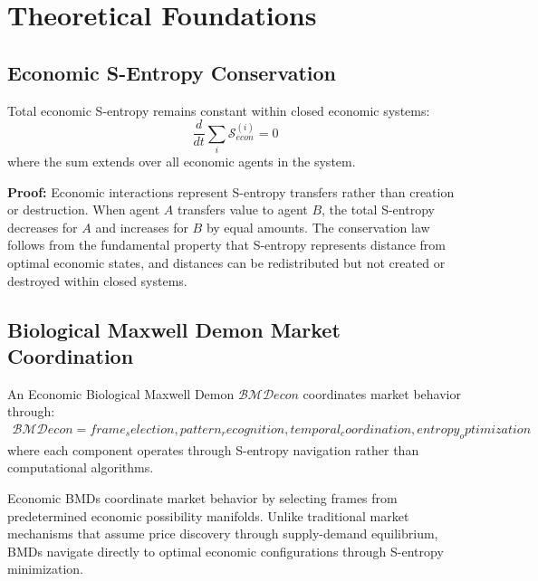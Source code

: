 \section{Theoretical Foundations}

\subsection{Economic S-Entropy Conservation}

\begin{theorem}
Total economic S-entropy remains constant within closed economic systems:
\begin{equation}
\frac{d}{dt}\sum_{i} \mathcal{S}_{econ}^{(i)} = 0
\end{equation}
where the sum extends over all economic agents in the system.

\textbf{Proof:}
Economic interactions represent S-entropy transfers rather than creation or destruction. When agent $A$ transfers value to agent $B$, the total S-entropy decreases for $A$ and increases for $B$ by equal amounts. The conservation law follows from the fundamental property that S-entropy represents distance from optimal economic states, and distances can be redistributed but not created or destroyed within closed systems.
\end{theorem}

\subsection{Biological Maxwell Demon Market Coordination}

\begin{definition}
An Economic Biological Maxwell Demon $\mathcal{BMD}{econ}$ coordinates market behavior through:
\begin{align}
\mathcal{BMD}{econ} = {frame_selection, pattern_recognition, temporal_coordination, entropy_optimization}
\end{align}
where each component operates through S-entropy navigation rather than computational algorithms.
\end{definition}

Economic BMDs coordinate market behavior by selecting frames from predetermined economic possibility manifolds. Unlike traditional market mechanisms that assume price discovery through supply-demand equilibrium, BMDs navigate directly to optimal economic configurations through S-entropy minimization.

